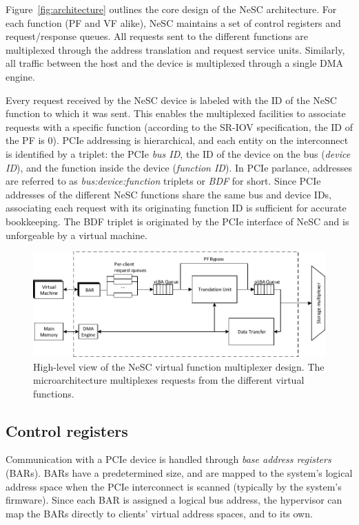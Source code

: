 Figure~\ref{fig:architecture} outlines the core design of the NeSC architecture. For each function (PF and VF alike), NeSC maintains a set of  control registers and request/response queues. All requests sent to the different functions are multiplexed through the address translation and request service units. Similarly, all traffic between the host and the device is multiplexed through a single DMA engine. 

Every request received by the NeSC device is labeled with the ID of the NeSC function to which it was sent. This enables the multiplexed facilities to associate requests with a specific function (according to the SR-IOV specification, the ID of the PF is 0). PCIe addressing is hierarchical, and each entity on the interconnect is identified by a triplet: the PCIe \emph{bus ID}, the ID of the device on the bus (\emph{device ID}), and the function inside the device (\emph{function ID}). In PCIe parlance, addresses are referred to as \emph{bus:device:function} triplets or \emph{BDF} for short. Since PCIe addresses of the different NeSC functions share the same bus and device IDs, associating each request with its originating function ID is sufficient for accurate bookkeeping.
The BDF triplet is originated by the PCIe interface of NeSC and is unforgeable by a virtual machine.   


\begin{figure}[th!]
  \vspace{-3ex}
  \centering
  \includegraphics[width=\textwidth]{figs/virtual_function.pdf}
  \caption{High-level view of the NeSC virtual function multiplexer design. The microarchitecture multiplexes requests from the different virtual functions.}
   \label{fig:virtualfunction}
\end{figure}
   

\subsection*{Control registers}
Communication with a PCIe device is handled through \emph{base address registers} (BARs). BARs have a predetermined size, and are mapped to the system's logical address space when the PCIe interconnect is scanned (typically by the system's firmware). Since each BAR is assigned a logical bus address, the hypervisor can map the BARs directly to clients' virtual address spaces, and to its own.

